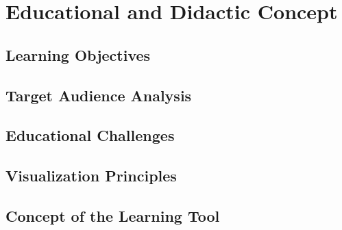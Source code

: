 \section{Educational and Didactic Concept}
\label{chap:educationalConcept}

\subsection{Learning Objectives}
\label{sec:learningObjectives}

\subsection{Target Audience Analysis}
\label{sec:targetAudience}

\subsection{Educational Challenges}
\label{sec:educationalChallenges}

\subsection{Visualization Principles}
\label{sec:visualizationPrinciples}

\subsection{Concept of the Learning Tool}
\label{sec:learningToolConcept}

